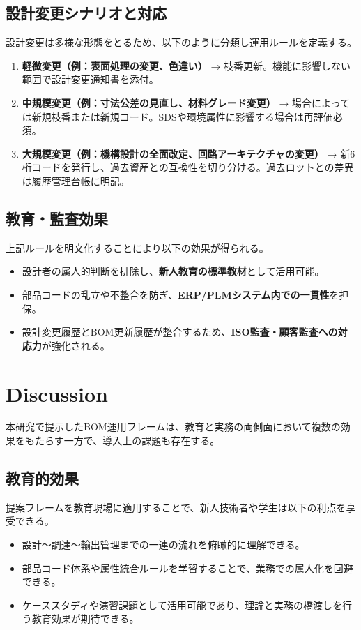 \documentclass[10pt,conference]{IEEEtran}
\begin{document}
\subsection{設計変更シナリオと対応}
設計変更は多様な形態をとるため、以下のように分類し運用ルールを定義する。
\begin{enumerate}
  \item \textbf{軽微変更（例：表面処理の変更、色違い）}  
  → 枝番更新。機能に影響しない範囲で設計変更通知書を添付。
  \item \textbf{中規模変更（例：寸法公差の見直し、材料グレード変更）}  
  → 場合によっては新規枝番または新規コード。SDSや環境属性に影響する場合は再評価必須。
  \item \textbf{大規模変更（例：機構設計の全面改定、回路アーキテクチャの変更）}  
  → 新6桁コードを発行し、過去資産との互換性を切り分ける。過去ロットとの差異は履歴管理台帳に明記。
\end{enumerate}

\subsection{教育・監査効果}
上記ルールを明文化することにより以下の効果が得られる。
\begin{itemize}
  \item 設計者の属人的判断を排除し、\textbf{新人教育の標準教材}として活用可能。
  \item 部品コードの乱立や不整合を防ぎ、\textbf{ERP/PLMシステム内での一貫性}を担保。
  \item 設計変更履歴とBOM更新履歴が整合するため、\textbf{ISO監査・顧客監査への対応力}が強化される。
\end{itemize}

\section{Discussion}
本研究で提示したBOM運用フレームは、教育と実務の両側面において複数の効果をもたらす一方で、導入上の課題も存在する。

\subsection{教育的効果}
提案フレームを教育現場に適用することで、新人技術者や学生は以下の利点を享受できる。
\begin{itemize}
  \item 設計～調達～輸出管理までの一連の流れを俯瞰的に理解できる。
  \item 部品コード体系や属性統合ルールを学習することで、業務での属人化を回避できる。
  \item ケーススタディや演習課題として活用可能であり、理論と実務の橋渡しを行う教育効果が期待できる。
\end{itemize}
\end{document}
